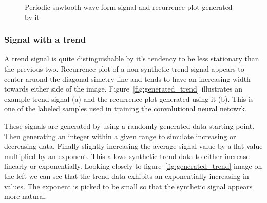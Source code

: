 \documentclass[a4paper,12pt,fleqn]{article}
\begin{document}
\begin{figure}
  \centering
  \qquad
  \caption{Periodic sawtooth wave form signal and recurrence plot generated by it}
  \label{fig:generated_periodic_sawtooth}
\end{figure}


\subsubsection{Signal with a trend}
A trend signal is quite distinguishable by it's tendency to be less stationary than the previous two.
Recurrence plot of a non synthetic trend signal appears to center aruond the diagonal simetry line and tends to have an increasing width towards either side of the image.
Figure~\ref{fig:generated_trend} illustrates an example trend signal (a) and the recurrence plot generated using it (b).
This is one of the labeled samples used in training the convolutional neural netowrk.

These signals are generated by using a randomly generated data starting point. Then generating an integer within a given range to simulate increasing or decreasing data.
Finally slightly increasing the average signal value by a flat value multiplied by an exponent.
This allows synthetic trend data to either increase linearly or exponentially.
Looking closely to figure~\ref{fig:generated_trend} image on the left we can see that the trend data exhibits an exponentially increasing in values.
The exponent is picked to be small so that the synthetic signal appears more
natural.
\end{document}
